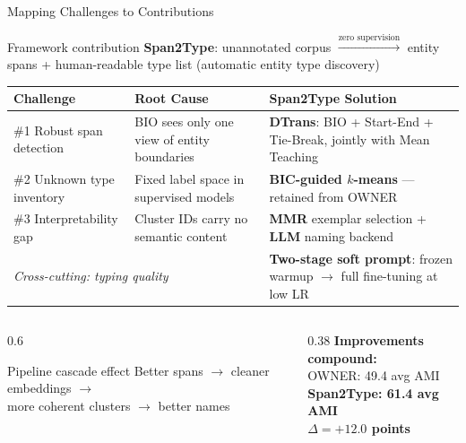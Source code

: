 \documentclass[aspectratio=169,10pt]{beamer}
\newcommand{\hb}[1]{\textcolor{navyblue}{\textbf{#1}}}
\newcommand{\hg}[1]{\textcolor{dkgreen}{\textbf{#1}}}
\begin{document}
\begin{frame}{Mapping Challenges to Contributions}
  \vspace{-0.3em}
  \begin{block}{\small Framework contribution}
    \small\textbf{Span2Type}: unannotated corpus $\xrightarrow{\text{zero supervision}}$ entity spans + human-readable type list (automatic entity type discovery)
  \end{block}
  \vspace{0.15em}
  \begin{center}
  \small
  \setlength{\tabcolsep}{5pt}
  \renewcommand{\arraystretch}{1.3}
  \begin{tabular}{p{3.3cm}|p{3.3cm}|p{5cm}}
    \toprule
    \textbf{Challenge} & \textbf{Root Cause} & \textbf{Span2Type Solution} \\
    \midrule
    \#1 Robust span detection & BIO sees only one view of entity boundaries & \hb{DTrans}: BIO + Start-End + Tie-Break, jointly with Mean Teaching \\
    \hline
    \#2 Unknown type inventory & Fixed label space in supervised models & \hb{BIC-guided $k$-means} — retained from OWNER \\
    \hline
    \#3 Interpretability gap & Cluster IDs carry no semantic content & \hb{MMR} exemplar selection + \hb{LLM} naming backend \\
    \hline
    \multicolumn{2}{l|}{\textit{Cross-cutting: typing quality}} & \hb{Two-stage soft prompt}: frozen warmup $\to$ full fine-tuning at low LR \\
    \bottomrule
  \end{tabular}
  \end{center}
  \vspace{0.2em}
  \begin{columns}
    \begin{column}{0.6\textwidth}
      \begin{exampleblock}{Pipeline cascade effect}
        Better spans $\to$ cleaner embeddings $\to$\\
        more coherent clusters $\to$ better names
      \end{exampleblock}
    \end{column}
    \begin{column}{0.38\textwidth}
      \small
      \textbf{Improvements compound:}\\
      OWNER: 49.4 avg AMI\\
      \textbf{Span2Type: 61.4 avg AMI}\\
      \hg{$\Delta = +12.0$ points}
    \end{column}
  \end{columns}
\end{frame}
\end{document}
